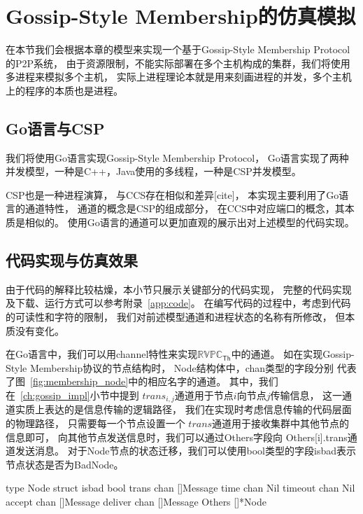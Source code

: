 \section{Gossip-Style Membership的仿真模拟}
在本节我们会根据本章的模型来实现一个基于Gossip-Style Membership Protocol的P2P系统，
由于资源限制，不能实际部署在多个主机构成的集群，我们将使用多进程来模拟多个主机，
实际上进程理论本就是用来刻画进程的并发，多个主机上的程序的本质也是进程。

\subsection{Go语言与CSP}
我们将使用Go语言实现Gossip-Style Membership Protocol，
Go语言实现了两种并发模型，一种是C++，Java使用的多线程，一种是CSP并发模型。

CSP也是一种进程演算，
与CCS存在相似和差异[cite]，
本实现主要利用了Go语言的通道特性，
通道的概念是CSP的组成部分，
在CCS中对应端口的概念，其本质是相似的。
使用Go语言的通道可以更加直观的展示出对上述模型的代码实现。

\subsection{代码实现与仿真效果}

 由于代码的解释比较枯燥，本小节只展示关键部分的代码实现，
 完整的代码实现及下载、运行方式可以参考附录~\ref{app:code}。
 在编写代码的过程中，考虑到代码的可读性和字符的限制，
 我们对前述模型通道和进程状态的名称有所修改，
 但本质没有变化。

 在Go语言中，我们可以用channel特性来实现$\mathbb{RVPC}_{\mathsf{Th}}$中的通道。
 如在实现Gossip-Style Membership协议的节点结构时，
 Node结构体中，chan类型的字段分别
 代表了图~\ref{fig:membership_node}中的相应名字的通道。
 其中，我们在~\ref{ch:gossip_impl}小节中提到
 $trans_{i,j}$通道用于节点$i$向节点$j$传输信息，
 这一通道实质上表达的是信息传输的逻辑路径，
 我们在实现时考虑信息传输的代码层面的物理路径，
 只需要每一个节点设置一个
 $trans$通道用于接收集群中其他节点的信息即可，
 向其他节点发送信息时，我们可以通过Others字段向
 Others[i].trans通道发送消息。
 对于Node节点的状态迁移，我们可以使用bool类型的字段isbad表示节点状态是否为BadNode。
 \begin{codeblock}[language=GO]
   type Node struct {
      isbad bool
      trans chan []Message
      time chan Nil
      timeout chan Nil
      accept chan []Message
      deliver chan []Message
      Others []*Node
   }
\end{codeblock}

